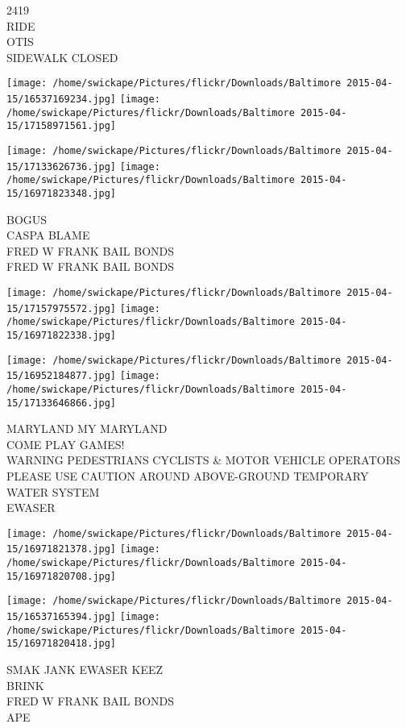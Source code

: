 \documentclass[10pt,letterpaper]{article}
\begin{document}
2419\\
RIDE\\
OTIS\\
SIDEWALK CLOSED
\pagebreak

\texttt{[image: /home/swickape/Pictures/flickr/Downloads/Baltimore 2015-04-15/16537169234.jpg]}
\texttt{[image: /home/swickape/Pictures/flickr/Downloads/Baltimore 2015-04-15/17158971561.jpg]}

\texttt{[image: /home/swickape/Pictures/flickr/Downloads/Baltimore 2015-04-15/17133626736.jpg]}
\texttt{[image: /home/swickape/Pictures/flickr/Downloads/Baltimore 2015-04-15/16971823348.jpg]}

BOGUS\\
CASPA BLAME\\
FRED W FRANK BAIL BONDS\\
FRED W FRANK BAIL BONDS
\pagebreak

\texttt{[image: /home/swickape/Pictures/flickr/Downloads/Baltimore 2015-04-15/17157975572.jpg]}
\texttt{[image: /home/swickape/Pictures/flickr/Downloads/Baltimore 2015-04-15/16971822338.jpg]}

\texttt{[image: /home/swickape/Pictures/flickr/Downloads/Baltimore 2015-04-15/16952184877.jpg]}
\texttt{[image: /home/swickape/Pictures/flickr/Downloads/Baltimore 2015-04-15/17133646866.jpg]}

MARYLAND MY MARYLAND\\
COME PLAY GAMES!\\
WARNING PEDESTRIANS CYCLISTS \& MOTOR VEHICLE OPERATORS PLEASE USE CAUTION AROUND ABOVE{-}GROUND TEMPORARY WATER SYSTEM\\
EWASER
\pagebreak

\texttt{[image: /home/swickape/Pictures/flickr/Downloads/Baltimore 2015-04-15/16971821378.jpg]}
\texttt{[image: /home/swickape/Pictures/flickr/Downloads/Baltimore 2015-04-15/16971820708.jpg]}

\texttt{[image: /home/swickape/Pictures/flickr/Downloads/Baltimore 2015-04-15/16537165394.jpg]}
\texttt{[image: /home/swickape/Pictures/flickr/Downloads/Baltimore 2015-04-15/16971820418.jpg]}

SMAK JANK EWASER KEEZ\\
BRINK\\
FRED W FRANK BAIL BONDS\\
APE
\pagebreak
\end{document}
